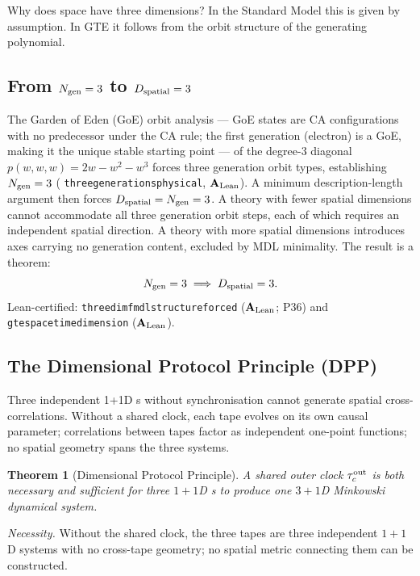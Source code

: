 \documentclass[11pt,openany]{book}
\newtheorem{theorem}{Theorem}[chapter]
\theoremstyle{remark}
\newcommand{\lean}[1]{%
  \penalty-100
  \begingroup\def\_{\textunderscore\allowbreak}\texttt{#1}\endgroup}
\newcommand{\CMCA}{\text{CMCA}}
\newcommand{\CatAL}{\ensuremath{\textbf{A}_{\rm Lean}}}
\begin{document}
Why does space have three dimensions? In the Standard Model this is given by assumption.
In GTE it follows from the orbit structure of the generating polynomial.

\subsection*{From $N_{\rm gen} = 3$ to $D_{\rm spatial} = 3$}

The Garden of Eden (GoE) orbit analysis --- GoE states are CA configurations with no predecessor under the CA rule; the first generation (electron) is a GoE, making it the unique stable starting point --- of the degree-3 diagonal $p(w,w,w) = 2w - w^2 - w^3$
forces three generation orbit types, establishing $N_{\rm gen} = 3$
(\lean{three\_generations\_physical}, \CatAL).
A minimum description-length argument then forces $D_{\rm spatial} = N_{\rm gen} = 3$.
A theory with fewer spatial dimensions cannot accommodate all three generation orbit
steps, each of which requires an independent spatial direction.
A theory with more spatial dimensions introduces axes carrying no generation content,
excluded by MDL minimality.
The result is a theorem:
\begin{equation}
  N_{\rm gen} = 3 \;\Longrightarrow\; D_{\rm spatial} = 3.
  \label{eq:dim_from_ngen}
\end{equation}
Lean-certified:
\lean{three\_dim\_fmdl\_structure\_forced} (\CatAL; P36)
and \lean{gte\_spacetime\_dimension} (\CatAL).

\subsection*{The Dimensional Protocol Principle (DPP)}

Three independent 1+1D \CMCA{}s without synchronisation cannot generate spatial
cross-correlations.
Without a shared clock, each tape evolves on its own causal parameter; correlations
between tapes factor as independent one-point functions; no spatial geometry spans the
three systems.



\begin{theorem}[Dimensional Protocol Principle]
A shared outer clock $\tau_c^{\rm out}$ is both necessary and sufficient for three
$1{+}1$D \CMCA{}s to produce one $3{+}1$D Minkowski dynamical system.
\end{theorem}

\noindent\textit{Necessity.} Without the shared clock, the three tapes are three
independent $1{+}1$D systems with no cross-tape geometry; no spatial metric connecting
them can be constructed.
\end{document}
